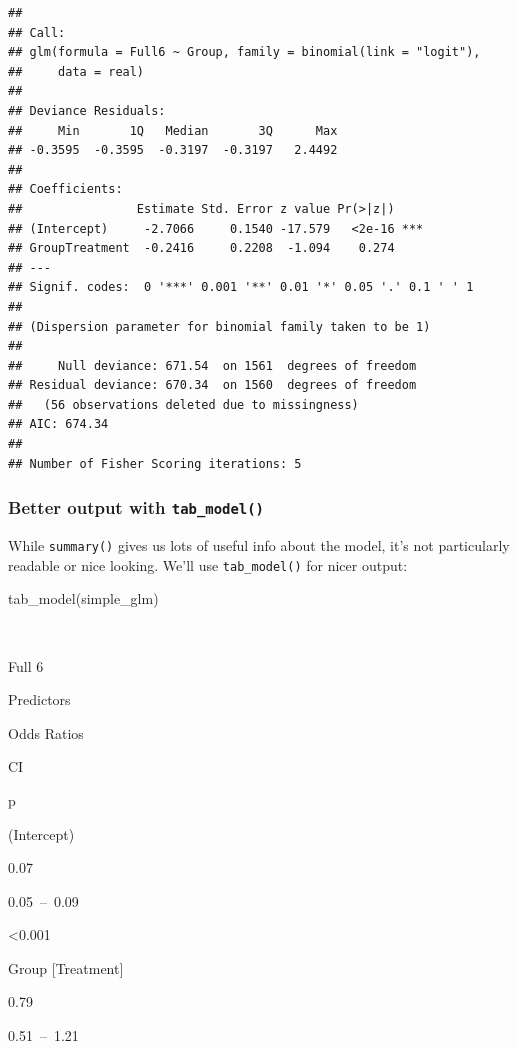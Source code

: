 \documentclass[
]{book}
\newenvironment{Shaded}{\begin{snugshade}}{\end{snugshade}}
\newcommand{\FunctionTok}[1]{\textcolor[rgb]{0.00,0.00,0.00}{#1}}
\newcommand{\NormalTok}[1]{#1}
\begin{document}
\begin{verbatim}
## 
## Call:
## glm(formula = Full6 ~ Group, family = binomial(link = "logit"), 
##     data = real)
## 
## Deviance Residuals: 
##     Min       1Q   Median       3Q      Max  
## -0.3595  -0.3595  -0.3197  -0.3197   2.4492  
## 
## Coefficients:
##                Estimate Std. Error z value Pr(>|z|)    
## (Intercept)     -2.7066     0.1540 -17.579   <2e-16 ***
## GroupTreatment  -0.2416     0.2208  -1.094    0.274    
## ---
## Signif. codes:  0 '***' 0.001 '**' 0.01 '*' 0.05 '.' 0.1 ' ' 1
## 
## (Dispersion parameter for binomial family taken to be 1)
## 
##     Null deviance: 671.54  on 1561  degrees of freedom
## Residual deviance: 670.34  on 1560  degrees of freedom
##   (56 observations deleted due to missingness)
## AIC: 674.34
## 
## Number of Fisher Scoring iterations: 5
\end{verbatim}

\hypertarget{better-output-with-tab_model}{%
\subsubsection*{\texorpdfstring{Better output with \texttt{tab\_model()}}{Better output with tab\_model()}}\label{better-output-with-tab_model}}

While \texttt{summary()} gives us lots of useful info about
the model, it's not particularly readable or nice looking.
We'll use \texttt{tab\_model()} for nicer output:

\begin{Shaded}
\begin{Highlighting}[]
\FunctionTok{tab\_model}\NormalTok{(simple\_glm)}
\end{Highlighting}
\end{Shaded}

~

Full 6

Predictors

Odds Ratios

CI

p

(Intercept)

0.07

0.05~--~0.09

\textless0.001

Group {[}Treatment{]}

0.79

0.51~--~1.21
\end{document}
